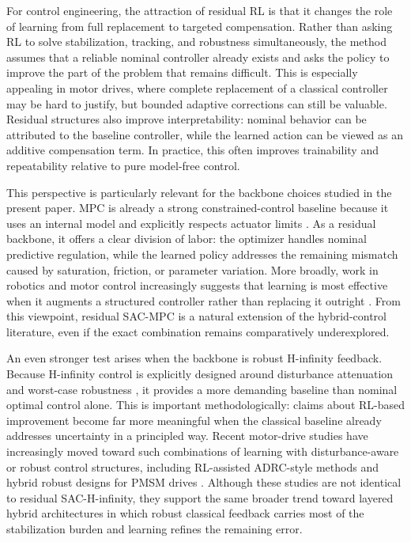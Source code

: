 \documentclass[conference]{IEEEtran}
\begin{document}
For control engineering, the attraction of residual RL is that it changes the role of learning from full replacement to targeted compensation. Rather than asking RL to solve stabilization, tracking, and robustness simultaneously, the method assumes that a reliable nominal controller already exists and asks the policy to improve the part of the problem that remains difficult. This is especially appealing in motor drives, where complete replacement of a classical controller may be hard to justify, but bounded adaptive corrections can still be valuable. Residual structures also improve interpretability: nominal behavior can be attributed to the baseline controller, while the learned action can be viewed as an additive compensation term. In practice, this often improves trainability and repeatability relative to pure model-free control.

This perspective is particularly relevant for the backbone choices studied in the present paper. MPC is already a strong constrained-control baseline because it uses an internal model and explicitly respects actuator limits \cite{mayne2000}. As a residual backbone, it offers a clear division of labor: the optimizer handles nominal predictive regulation, while the learned policy addresses the remaining mismatch caused by saturation, friction, or parameter variation. More broadly, work in robotics and motor control increasingly suggests that learning is most effective when it augments a structured controller rather than replacing it outright \cite{johannink2019,motorreview2024,review2025pmsm}. From this viewpoint, residual SAC-MPC is a natural extension of the hybrid-control literature, even if the exact combination remains comparatively underexplored.

An even stronger test arises when the backbone is robust H-infinity feedback. Because H-infinity control is explicitly designed around disturbance attenuation and worst-case robustness \cite{doyle1989,zhou1996}, it provides a more demanding baseline than nominal optimal control alone. This is important methodologically: claims about RL-based improvement become far more meaningful when the classical baseline already addresses uncertainty in a principled way. Recent motor-drive studies have increasingly moved toward such combinations of learning with disturbance-aware or robust control structures, including RL-assisted ADRC-style methods and hybrid robust designs for PMSM drives \cite{wang2023tec,wang2023tpe}. Although these studies are not identical to residual SAC-H-infinity, they support the same broader trend toward layered hybrid architectures in which robust classical feedback carries most of the stabilization burden and learning refines the remaining error.
\end{document}

